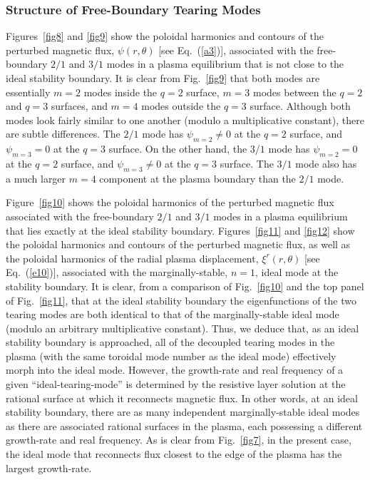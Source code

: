 \documentclass[12pt,prb,aps]{revtex4-1}
\begin{document}
\subsubsection{Structure of Free-Boundary Tearing Modes}
Figures~\ref{fig8} and \ref{fig9} show the poloidal harmonics and contours of the perturbed magnetic flux, $\psi(r,\theta)$ [see Eq.~(\ref{a3})], associated
with the free-boundary  $2/1$ and $3/1$ modes in a  plasma equilibrium that is not close to the ideal stability boundary. It is clear from Fig.~\ref{fig9} that both modes are essentially $m=2$ modes inside the $q=2$ surface, $m=3$ modes between
the $q=2$ and $q=3$ surfaces, and $m=4$ modes outside the $q=3$ surface. Although both modes look fairly similar to
one another (modulo a multiplicative constant), there are subtle differences. The $2/1$ mode  has $\psi_{m=2}\neq 0$ at the $q=2$ surface, and $\psi_{m=3}=0$ at the $q=3$ surface.
On the other hand, the $3/1$ mode  has $\psi_{m=2}= 0$ at the $q=2$ surface, and $\psi_{m=3}\neq 0$ at the $q=3$  surface. The  $3/1$ mode also has a much larger $m=4$ component at the plasma boundary than the $2/1$ mode. 

Figure~\ref{fig10} shows the poloidal harmonics of the perturbed magnetic flux associated
with the free-boundary $2/1$ and $3/1$ modes in a  plasma equilibrium 
that lies exactly at the ideal stability boundary. Figures~\ref{fig11} and \ref{fig12} show the poloidal harmonics and contours of the perturbed magnetic flux, as well
as the poloidal harmonics of the radial
plasma displacement, $\xi^r(r,\theta)$ [see Eq.~(\ref{e10})], associated with the marginally-stable, $n=1$, ideal mode at the stability boundary. It is
clear, from a comparison of Fig.~\ref{fig10} and the top panel of Fig.~\ref{fig11}, that at the ideal stability boundary the eigenfunctions of the two
tearing modes are both  identical to that of the marginally-stable ideal mode (modulo an arbitrary multiplicative constant). Thus, we deduce that, as
an ideal stability boundary is approached, all of the decoupled tearing modes in the plasma (with the same toroidal mode number as the ideal mode)
effectively morph into the ideal mode. However, the growth-rate and real frequency of a given ``ideal-tearing-mode'' is determined by the 
resistive layer solution at the rational surface at which it reconnects magnetic flux. In other words, at an ideal stability boundary, there are as
many independent marginally-stable ideal modes as there are associated rational surfaces in the plasma, each possessing a different growth-rate and
real frequency. As is clear from Fig.~\ref{fig7}, in the present case, the ideal mode that reconnects flux closest to the edge of the plasma has the largest growth-rate. 
\end{document}
